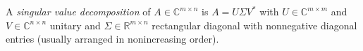 
A \emph{singular value decomposition} of $A\in\mathbb C^{m\times n}$ is $A=U\Sigma V^*$ with $U\in\mathbb C^{m\times m}$ and $V\in\mathbb C^{n\times n}$ unitary and $\Sigma\in\mathbb R^{m\times n}$ rectangular diagonal with nonnegative diagonal entries (usually arranged in nonincreasing order).
